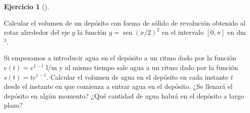 \documentclass[
  spanish,
  a4paper,
]{scrreport}
\theoremstyle{definition}
\newtheorem{exercise}{Ejercicio}[chapter]
\theoremstyle{remark}
\begin{document}
\begin{exercise}[]\protect\hypertarget{exr-3}{}\label{exr-3}

Calcular el volumen de un depósito con forma de sólido de revolución
obtenido al rotar alrededor del eje \(y\) la función
\(y = \operatorname{sen}(x/2)^2\) en el intervalo \([0, \pi]\) en
dm\(^3\).

Si empezamos a introducir agua en el depósito a un ritmo dado por la
función \(e(t)=e^{1-t}\) l/m y al mismo tiempo sale agua a un ritmo dado
por la función \(s(t)=te^{1-t}\). Calcular el volumen de agua en el
depósito en cada instante \(t\) desde el instante en que comienza a
entrar agua en el depósito. ¿Se llenará el depósito en algún momento?
¿Qué cantidad de agua habrá en el depósito a largo plazo?

\end{exercise}
\end{document}
